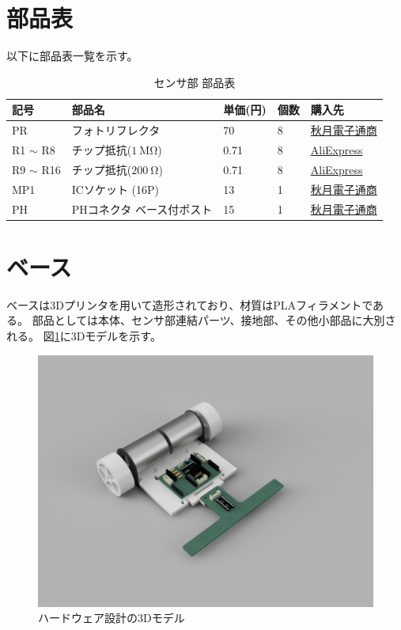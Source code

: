 \documentclass{ltjsreport}
\begin{document}
\section{部品表}
以下に部品表一覧を示す。

\begin{table}[H]
  \begin{center}
    \begin{tabular}{l|l|l|l|l} \hline
      記号 & 部品名 & 単価(円) & 個数 & 購入先 \\ \hline
      PR & フォトリフレクタ & 70 & 8 & \href{https://akizukidenshi.com/catalog/g/g104500/}{秋月電子通商} \\
      R1 $\sim$ R8 & チップ抵抗($\SI{1}{\Mohm}$) & 0.71 & 8 & \href{https://ja.aliexpress.com/item/1005001794062302.html?channel=twinner}{AliExpress} \\
      R9 $\sim$ R16 & チップ抵抗($\SI{200}{\ohm}$) & 0.71 & 8 & \href{https://ja.aliexpress.com/item/1005001794062302.html?channel=twinner}{AliExpress} \\
      MP1 & ICソケット (16P) & 13 & 1 & \href{https://akizukidenshi.com/catalog/g/g100007/}{秋月電子通商} \\
      PH & PHコネクタ ベース付ポスト & 15 & 1 & \href{https://akizukidenshi.com/catalog/g/g112806/}{秋月電子通商}\\\hline
    \end{tabular}
    \caption{センサ部 部品表}
    \label{センサ部品表}
  \end{center}
\end{table}
\section{ベース}
ベースは3Dプリンタを用いて造形されており、材質はPLAフィラメントである。
部品としては本体、センサ部連結パーツ、接地部、その他小部品に大別される。
図\ref{fig:3dmodel}に3Dモデルを示す。

\begin{figure}[tbh]
  \centering
  \includegraphics[keepaspectratio, scale=0.4]
       {img/figure_carFramev3_angle.png}
  \caption{ハードウェア設計の3Dモデル}
  \label{fig:3dmodel}
 \end{figure}
\end{document}
